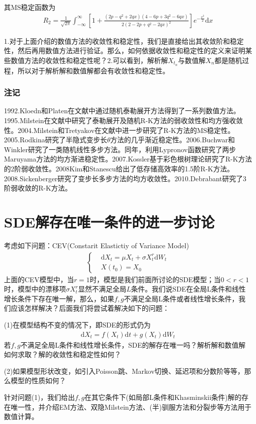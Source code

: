             其MS稳定函数为
            \begin{align*}
            R_2 = \frac{1}{\sqrt{2\pi}}\int_{-\infty}^{\infty}\left[ 1+\frac{(2p-q^2+2qx)(4-6p+3q^2-6qx)}{2(2-2p+q^2 - 2qx)^2} \right]e^{-\frac{x^2}{2}}\mathrm{d}x
            \end{align*}
            \par
            1.对于上面介绍的数值方法的收敛性和稳定性，我们是直接给出其收敛阶和稳定性，然后再用数值方法进行验证。那么，如何依据收敛性和稳定性的定义来证明某些数值方法的收敛性和稳定性呢？2.可以看到，解析解$X_{t_n}$与数值解$X_n$都是随机过程，所以对于解析解和数值解都会有收敛性和稳定性。
        \subsubsection{注记}
            1992.Kloedn和Platen在文献\cite{1992.Kloeden}中通过随机泰勒展开方法得到了一系列数值方法。1995.Milstein在文献\cite{1995.Milstein}中研究了泰勒展开及随机R-K方法的弱收敛性和均方强收敛性。2004.Milstein和Tretyakov在文献\cite{2004.Milstein}中进一步研究了R-K方法的MS稳定性。2005.Rodkina研究了半隐式变步长$\theta$方法的几乎渐近稳定性。2006.Buchwar和Winkler研究了一类随机线性多步方法。同年，利用Lypronov函数研究了两步Maruyama方法的均方渐进稳定性。2007.Kossler基于彩色根树理论研究了R-K方法的2阶弱收敛性。2008Kim和Stanescu给出了低存储高效率的1.5阶R-K方法。2008.Sickenberger研究了变步长多步方法的均方收敛性。2010.Debrabant研究了3阶弱收敛的R-K方法。

\section{SDE解存在唯一条件的进一步讨论}
    \par
    考虑如下问题：CEV(Constarit Elastictiy of Variance Model)
    \begin{align*}
        \left\{
            \begin{aligned}
            &\mathrm{d}X_t = \mu X_t + \sigma X_t^r \mathrm{d}W_t\\
            &X(t_0) = X_0
            \end{aligned}
        \right.
    \end{align*}
    上面的CEV模型中，当$r=1$时，模型是我们前面所讨论的SDE模型；当$0<r<1$时，模型中的漂移项$\sigma X_t^r$显然不满足全局$L$条件。我们说SDE在全局L条件和线性增长条件下存在唯一解，那么，如果$f,g$不满足全局L条件或者线性增长条件，我们应该怎样解决？后面我们将尝试着解决如下的问题：
    \par
    (1)在模型结构不变的情况下，即SDE的形式仍为
    \begin{align*}
        \mathrm{d}X_t = f(X_t)\mathrm{d}t + g(X_t)\mathrm{d}W_t
    \end{align*}
    若$f,g$不满足全局L条件和线性增长条件，SDE的解存在唯一吗？解析解和数值解如何求取？解的收敛性和稳定性如何？
    \par
    (2)如果模型形状改变，如引入Poisson跳、Markov切换、延迟项和分数阶等等，那么模型的性质如何？
    \par
    针对问题(1)，我们给出$f,g$在其它条件下(如局部L条件和Khasminskii条件)解的存在唯一性，并介绍EM方法、双隐Milstein方法、(半)驯服方法和分裂步等方法用于数值计算。
